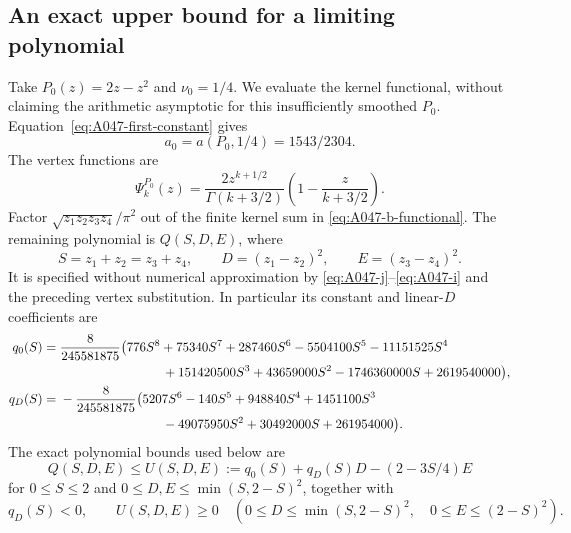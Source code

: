 \subsection*{An exact upper bound for a limiting polynomial}

Take \(P_0(z)=2z-z^2\) and \(\nu_0=1/4\).  We evaluate the
kernel functional, without claiming the arithmetic
asymptotic for this insufficiently smoothed \(P_0\).
Equation~\eqref{eq:A047-first-constant} gives
\begin{equation}\label{eq:A047-a0}
                         a_0=a(P_0,1/4)=1543/2304.
\end{equation}
The vertex functions are
\[
 \Psi_k^{P_0}(z)=
       \frac{2z^{k+1/2}}{\Gamma(k+3/2)}
                         \left(1-\frac{z}{k+3/2}\right).
\]
Factor \(\sqrt{z_1z_2z_3z_4}/\pi^2\) out of
the finite kernel sum in \eqref{eq:A047-b-functional}.
The remaining polynomial is \(Q(S,D,E)\), where
\[
 S=z_1+z_2=z_3+z_4,\qquad
 D=(z_1-z_2)^2,\qquad E=(z_3-z_4)^2 .
\]
It is specified without numerical approximation by
\eqref{eq:A047-j}--\eqref{eq:A047-i} and the preceding
vertex substitution.  In particular its constant and
linear-\(D\) coefficients are
\begin{align}
 q_0(S)={}&\frac8{245581875}
 \bigl(776S^8+75340S^7+287460S^6-5504100S^5
       -11151525S^4 \nonumber\\
 &\hspace{28mm}
       +151420500S^3+43659000S^2
                         -1746360000S+2619540000\bigr),
                                                    \label{eq:A047-q0}\\
 q_D(S)={}&-\frac8{245581875}
 \bigl(5207S^6-140S^5+948840S^4+1451100S^3
                    \nonumber\\
 &\hspace{28mm}
                    -49075950S^2+30492000S+261954000\bigr).
                                                    \label{eq:A047-qD}
\end{align}
The exact polynomial bounds used below are
\begin{equation}\label{eq:A047-poly-bound}
 Q(S,D,E)\le
 U(S,D,E):=q_0(S)+q_D(S)D-(2-3S/4)E
\end{equation}
for \(0\le S\le2\) and
\(0\le D,E\le\min(S,2-S)^2\), together with
\[
 q_D(S)<0,\qquad
 U(S,D,E)\ge0
 \quad\left(
 0\le D\le\min(S,2-S)^2,\quad
 0\le E\le(2-S)^2\right).
 \label{eq:A047-upper-positive}
\]

